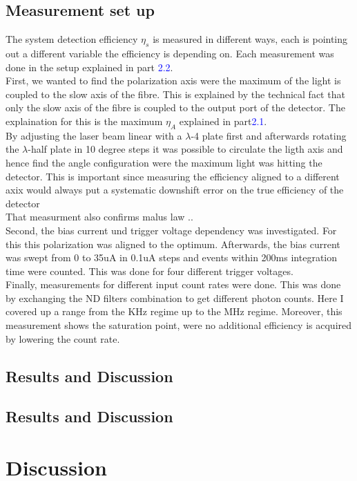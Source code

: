 \subsection*{Measurement set up}

The system detection efficiency $\eta_{s}$ is measured in different ways, each is pointing out a different variable
the efficiency is depending on. Each measurement was done in the setup explained in part \textcolor{blue}{2.2}.
\\

First, we wanted to find the polarization axis were the maximum of the light is coupled to the slow axis of the fibre.
This is explained by the technical fact that only the slow axis of the fibre is coupled to the output port of the
detector. The explaination for this is the maximum $\eta_{A}$ explained in part\textcolor{blue}{2.1}.\\
By adjusting the laser beam linear with a $\lambda$-4 plate first and afterwards rotating the $\lambda$-half plate
in 10 degree steps it was possible to circulate the ligth axis and hence find the angle configuration were the maximum
light was hitting the detector.
This is important since measuring the efficiency aligned to a different axix would always
put a systematic downshift error on the true efficiency of the detector\\

That measurment also confirms malus law ..\\

Second, the bias current und trigger voltage dependency was investigated.
For this this polarization was aligned to the optimum.
Afterwards, the bias current was swept from 0 to 35uA in 0.1uA steps and events within 200ms integration
time were counted. This was done for four different trigger voltages. \\

Finally, measurements for different input count rates were done.
This was done by exchanging the ND filters combination to get different photon counts.
Here I covered up a range from the KHz regime up to the MHz regime.
Moreover, this measurement shows the saturation point, were no additional efficiency is acquired by lowering the count rate.


\subsection*{Results and Discussion}

\subsection*{Results and Discussion}
\section{Discussion}


